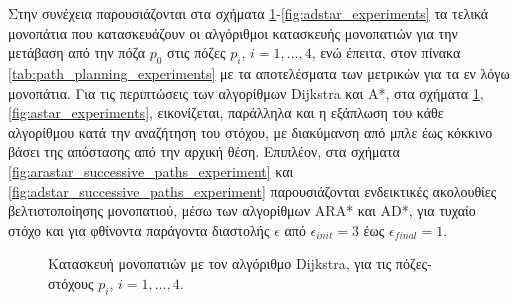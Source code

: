 Στην συνέχεια παρουσιάζονται στα σχήματα \ref{fig:dijkstra_experiments}-\ref{fig:adstar_experiments} τα τελικά μονοπάτια που κατασκευάζουν οι αλγόριθμοι κατασκευής μονοπατιών για την μετάβαση από την πόζα $p_0$ στις πόζες $p_i$, $i=1,...,4$, ενώ έπειτα, στον πίνακα \ref{tab:path_planning_experiments} με τα αποτελέσματα των μετρικών για τα εν λόγω μονοπάτια. Για τις περιπτώσεις των αλγορίθμων Dijkstra και A*, στα σχήματα \ref{fig:dijkstra_experiments}, \ref{fig:astar_experiments}, εικονίζεται, παράλληλα και η εξάπλωση του κάθε αλγορίθμου κατά την αναζήτηση του στόχου, με διακύμανση από μπλε έως κόκκινο βάσει της απόστασης από την αρχική θέση. Επιπλέον, στα σχήματα \ref{fig:arastar_successive_paths_experiment} και \ref{fig:adstar_successive_paths_experiment} παρουσιάζονται ενδεικτικές ακολουθίες βελτιστοποίησης μονοπατιού, μέσω των αλγορίθμων ARA* και AD*, για τυχαίο στόχο και για φθίνοντα παράγοντα διαστολής $\epsilon$ από $\epsilon_{init}=3$ έως $\epsilon_{final}=1$.

\begin{figure}[!ht]
	\centering
	 \vspace{0.01\linewidth}
	 \vspace{0.01\linewidth}
 	 \vspace{0.01\linewidth}
	\caption{Κατασκευή μονοπατιών με τον αλγόριθμο Dijkstra, για τις πόζες-στόχους $p_i$, $i=1,...,4$.}
	\label{fig:dijkstra_experiments}
\end{figure}

